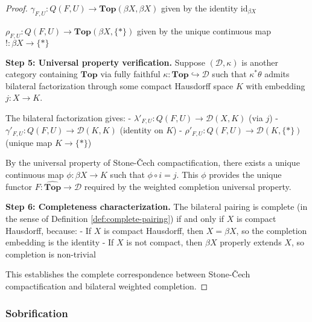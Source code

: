 \documentclass[11pt]{article}
\theoremstyle{plain}
\theoremstyle{definition}
\theoremstyle{remark}
\begin{document}
\begin{proof}
$\gamma_{F,U} : Q(F, U) \to \mathbf{Top}(\beta X, \beta X)$ given by the identity $\text{id}_{\beta X}$

$\rho_{F,U} : Q(F, U) \to \mathbf{Top}(\beta X, \{*\})$ given by the unique continuous map $! : \beta X \to \{*\}$

\textbf{Step 5: Universal property verification.}
Suppose $(\mathcal{D}, \kappa)$ is another category containing $\mathbf{Top}$ via fully faithful $\kappa : \mathbf{Top} \hookrightarrow \mathcal{D}$ such that $\kappa^* \theta$ admits bilateral factorization through some compact Hausdorff space $K$ with embedding $j : X \to K$.

The bilateral factorization gives:
- $\lambda'_{F,U} : Q(F, U) \to \mathcal{D}(X, K)$ (via $j$)
- $\gamma'_{F,U} : Q(F, U) \to \mathcal{D}(K, K)$ (identity on $K$)  
- $\rho'_{F,U} : Q(F, U) \to \mathcal{D}(K, \{*\})$ (unique map $K \to \{*\}$)

By the universal property of Stone-\v{C}ech compactification, there exists a unique continuous map $\phi : \beta X \to K$ such that $\phi \circ i = j$. This $\phi$ provides the unique functor $F : \widehat{\mathbf{Top}} \to \mathcal{D}$ required by the weighted completion universal property.

\textbf{Step 6: Completeness characterization.}
The bilateral pairing is complete (in the sense of Definition \ref{def:complete-pairing}) if and only if $X$ is compact Hausdorff, because:
- If $X$ is compact Hausdorff, then $X = \beta X$, so the completion embedding is the identity
- If $X$ is not compact, then $\beta X$ properly extends $X$, so completion is non-trivial

This establishes the complete correspondence between Stone-\v{C}ech compactification and bilateral weighted completion.
\end{proof}

\subsubsection{Sobrification}
\end{document}
